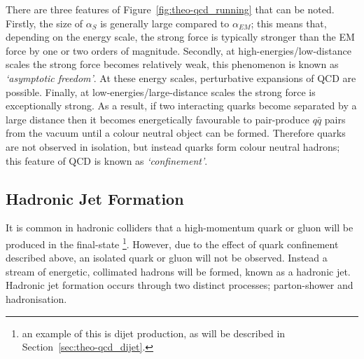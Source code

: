 There are three features of Figure~\ref{fig:theo-qcd_running} that can be noted.
Firstly, the size of $\alpha_S$ is generally large compared to $\alpha_{EM}$;
this means that, depending on the energy scale, the strong force is typically stronger than the EM force by one or two orders of magnitude.
Secondly, at high-energies/low-distance scales the strong force becomes relatively weak, this phenomenon is known as
\textit{`asymptotic freedom'}.
At these energy scales, perturbative expansions of QCD are possible.
Finally, at low-energies/large-distance scales the strong force is exceptionally strong.
As a result, if two interacting quarks become separated by a large distance then it becomes energetically favourable to
pair-produce $q\bar{q}$ pairs from the vacuum until a colour neutral object can be formed.
Therefore quarks are not observed in isolation, but instead quarks form colour neutral hadrons; this feature of QCD is known as \textit{`confinement'}.

\subsection{Hadronic Jet Formation}
\label{sec:theo-qcd_jets}

It is common in hadronic colliders that a high-momentum quark or gluon will be produced in the final-state
\footnote{an example of this is dijet production, as will be described in Section~\ref{sec:theo-qcd_dijet}.}.
However, due to the effect of quark confinement described above, an isolated quark or gluon will not be observed.
Instead a stream of energetic, collimated hadrons will be formed, known as a hadronic jet.
Hadronic jet formation occurs through two distinct processes; parton-shower and hadronisation.

